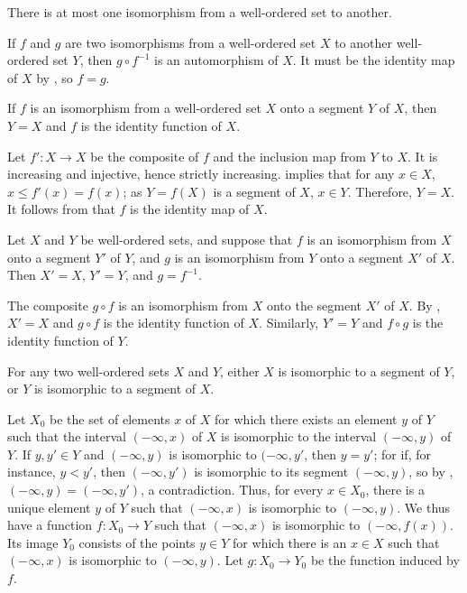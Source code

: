 \documentclass{article}
\begin{document}
\begin{theorem}
  \label{thm:uvocd4lt}
  There is at most one isomorphism from a well-ordered set to another.
\end{theorem}

If \(f\) and \(g\) are two isomorphisms from a well-ordered set \(X\)
to another well-ordered set \(Y\), then \(g \circ f^{-1}\) is an
automorphism of \(X\).  It must be the identity map of \(X\) by
, so \(f = g\).

\begin{theorem}
  \label{thm:q14zcdkw}
  If \(f\) is an isomorphism from a well-ordered set \(X\) onto a
  segment \(Y\) of \(X\), then \(Y = X\) and \(f\) is the identity
  function of \(X\).
\end{theorem}

Let \(f' : X \to X\) be the composite of \(f\) and the inclusion map
from \(Y\) to \(X\).  It is increasing and injective, hence strictly
increasing.   implies that for any \(x \in X\),
\(x \leq f'(x) = f(x)\); as \(Y = f(X)\) is a segment of \(X\),
\(x \in Y\).  Therefore, \(Y = X\).  It follows from
 that \(f\) is the identity map of \(X\).

\begin{theorem}
  \label{thm:7z7bwher}
  Let \(X\) and \(Y\) be well-ordered sets, and suppose that \(f\) is
  an isomorphism from \(X\) onto a segment \(Y'\) of \(Y\), and \(g\)
  is an isomorphism from \(Y\) onto a segment \(X'\) of \(X\).  Then
  \(X' = X\), \(Y' = Y\), and \(g = f^{-1}\).
\end{theorem}

The composite \(g \circ f\) is an isomorphism from \(X\) onto the
segment \(X'\) of \(X\).  By , \(X' = X\) and
\(g \circ f\) is the identity function of \(X\).  Similarly,
\(Y' = Y\) and \(f \circ g\) is the identity function of \(Y\).

\begin{theorem}
  \label{thm:vy95iuyi}
  For any two well-ordered sets \(X\) and \(Y\), either \(X\) is
  isomorphic to a segment of \(Y\), or \(Y\) is isomorphic to a
  segment of \(X\).
\end{theorem}

Let \(X_0\) be the set of elements \(x\) of \(X\) for which there
exists an element \(y\) of \(Y\) such that the interval
\((-\infty, x)\) of \(X\) is isomorphic to the interval
\((-\infty, y)\) of \(Y\).  If \(y, y' \in Y\) and \((-\infty, y)\) is
isomorphic to \((-\infty, y'\), then \(y = y'\); for if, for instance,
\(y < y'\), then \((-\infty, y')\) is isomorphic to its segment
\((-\infty, y)\), so by ,
\((-\infty, y) = (-\infty, y')\), a contradiction.  Thus, for every
\(x \in X_0\), there is a unique element \(y\) of \(Y\) such that
\((-\infty, x)\) is isomorphic to \((-\infty, y)\).  We thus have a
function \(f : X_0 \to Y\) such that \((-\infty, x)\) is isomorphic to
\((-\infty, f(x))\).  Its image \(Y_0\) consists of the points
\(y \in Y\) for which there is an \(x \in X\) such that
\((-\infty, x)\) is isomorphic to \((-\infty, y)\).  Let
\(g : X_0 \to Y_0\) be the function induced by \(f\).
\end{document}
